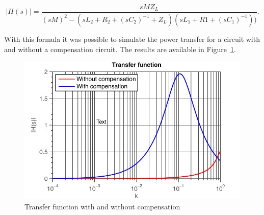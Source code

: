 \documentclass[11pt,titlepage]{report}
\begin{document}
\begin{equation} \label{eq:ass3-transfer-function}
	|H(s)| = \frac{s M Z_L}{(s M)^2 - (s L_2 + R_2 + (s C_2)^{-1} + Z_L) ( s L_1 + R1 + (s C_1)^{-1}))} .
\end{equation}

With this formula it was possible to simulate the power transfer for a circuit with and without a compensation circuit. The results are available in Figure~\ref{fig:ass2-transfer-function}.

\begin{figure}[H]
	\begin{center}
		\includegraphics[width=0.8\linewidth]{resource/transfer-function-rc.pdf}
	\end{center}
	\caption{Transfer function with and without compensation}
	\label{fig:ass2-transfer-function}
\end{figure}
\end{document}
